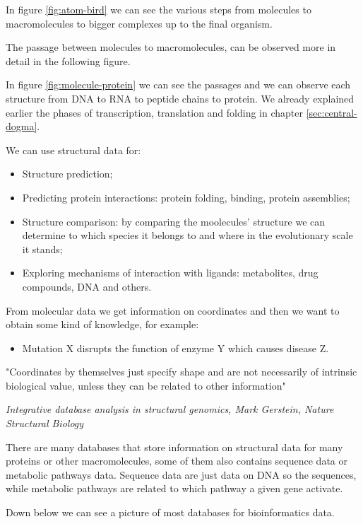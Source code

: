 In figure \ref{fig:atom-bird} we can see the various steps from molecules to macromolecules to bigger complexes up to the final organism.

The passage between molecules to macromolecules, can be observed more in detail in the following figure.

In figure \ref{fig:molecule-protein} we can see the passages and we can observe each structure from DNA to RNA to peptide chains to protein. We already explained earlier the phases of transcription, translation and folding in chapter \ref{sec:central-dogma}. 

We can use structural data for:
\begin{itemize}
    \item Structure prediction;
    \item Predicting protein interactions: protein folding, binding, protein assemblies;
    \item Structure comparison: by comparing the moolecules' structure we can determine to which species it belongs to and where in the evolutionary scale it stands;
    \item Exploring mechanisms of interaction with ligands: metabolites, drug compounds, DNA and others.
\end{itemize}

From molecular data we get information on coordinates and then we want to obtain some kind of knowledge, for example:
\begin{itemize}
    \item Mutation X disrupts the function of enzyme Y which causes disease Z.
\end{itemize}

\vspace{1em}

\noindent "Coordinates by themselves just specify shape and are not necessarily of intrinsic biological value, unless they can be related to other information"

\noindent \small{\textit{Integrative database analysis in structural genomics, Mark Gerstein, Nature Structural Biology}}

\normalsize{There are many databases that store information on structural data for many proteins or other macromolecules, some of them also contains sequence data or metabolic pathways data. Sequence data are just data on DNA so the sequences, while metabolic pathways are related to which pathway a given gene activate.}

Down below we can see a picture of most databases for bioinformatics data.

